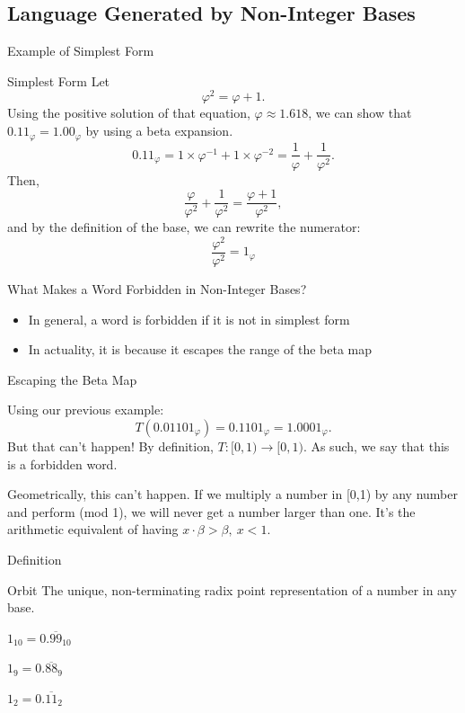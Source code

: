 \documentclass{beamer}
\begin{document}
\subsection{Language Generated by Non-Integer Bases}
\begin{frame}{Example of Simplest Form}
  \begin{block}{Simplest Form}
    Let $$\varphi^2 = \varphi + 1.$$
    Using the positive solution of that equation, $\varphi \approx 1.618$, we can show that $0.11_\varphi = 1.00_\varphi$ by using a beta expansion.
    $$0.11_\varphi = 1\times\varphi^{-1} + 1\times\varphi^{-2} = \frac{1}{\varphi} + \frac{1}{\varphi^2}.$$
    Then,
    $$\frac{\varphi}{\varphi^2} + \frac{1}{\varphi^2} = \frac{\varphi+1}{\varphi^2},$$
    and by the definition of the base, we can rewrite the numerator:
    $$\frac{\varphi^2}{\varphi^2} = 1_\varphi$$
  \end{block}
\end{frame}

\begin{frame}{What Makes a Word Forbidden in Non-Integer Bases?}
  \begin{itemize}
    \item In general, a word is forbidden if it is not in simplest form \pause
    \item In actuality, it is because it escapes the range of the beta map
  \end{itemize}
\end{frame}

\begin{frame}{Escaping the Beta Map}
  \begin{example}
    Using our previous example:
    $$T(0.01101_\varphi)=0.1101_\varphi=1.0001_\varphi.$$ \pause
    But that can't happen! By definition, $T:[0,1)\to[0,1)$. As such, we say that this is a forbidden word. \pause

    Geometrically, this can't happen. If we multiply a number in [0,1) by any number and perform (mod 1), we will never get a number larger than one. It's the arithmetic equivalent of having $x\cdot\beta > \beta,\ x<1$.
  \end{example}
\end{frame}

\begin{frame}{Definition}
  \begin{block}{Orbit}
    The unique, non-terminating radix point representation of a number in any base.
  \end{block}\pause

  \begin{example} \pause
    $1_{10} = 0.\overline{99}_{10}$ \pause

    $1_{9} = 0.\overline{88}_{9}$ \pause

    $1_{2} = 0.\overline{11}_{2}$
  \end{example}
\end{frame}
\end{document}
